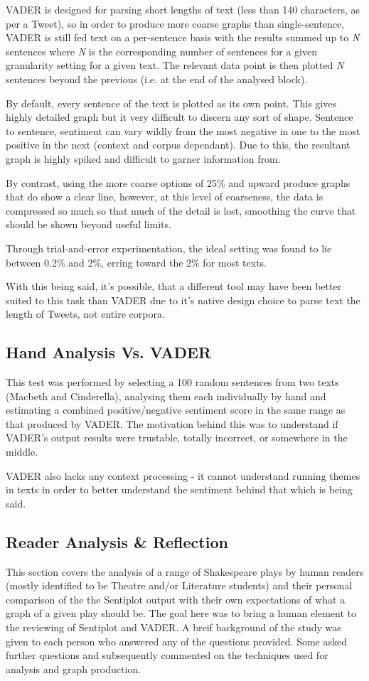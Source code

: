 \documentclass{article}
\begin{document}
        VADER is designed for parsing short lengths of text (less than 140 characters, as per a Tweet), so in order to produce more coarse graphs than single-sentence, VADER is still fed text on a per-sentence basis with the results summed up to \emph{N} sentences where \emph{N} is the corresponding number of sentences for a given granularity setting for a given text. The relevant data point is then plotted \emph{N} sentences beyond the previous (i.e. at the end of the analysed block).

        By default, every sentence of the text is plotted as its own point. This gives highly detailed graph but it very difficult to discern any sort of shape. Sentence to sentence, sentiment can vary wildly from the most negative in one to the most positive in the next (context and corpus dependant). Due to this, the resultant graph is highly spiked and difficult to garner information from.

        By contrast, using the more coarse options of 25\% and upward produce graphs that do show a clear line, however, at this level of coarseness, the data is compressed so much so that much of the detail is lost, smoothing the curve that should be shown beyond useful limits.

        Through trial-and-error experimentation, the ideal setting was found to lie between 0.2\% and 2\%, erring toward the 2\% for most texts.

        
        With this being said, it's possible, that a different tool may have been better suited to this task than VADER due to it's native design choice to parse text the length of Tweets, not entire corpora.
    \subsection{Hand Analysis Vs. VADER}
        This test was performed by selecting a 100 random sentences from two texts (Macbeth and Cinderella), analysing them each individually by hand and estimating a combined positive/negative sentiment score in the same range as that produced by VADER. The motivation behind this was to understand if VADER's output results were trustable, totally incorrect, or somewhere in the middle.

        VADER also lacks any context processing - it cannot understand running themes in texts in order to better understand the sentiment behind that which is being said.
    \subsection{Reader Analysis \& Reflection}
    \label{subsec:reader}
        This section covers the analysis of a range of Shakespeare plays by human readers (mostly identified to be Theatre and/or Literature students) and their personal comparison of the the Sentiplot output with their own expectations of what a graph of a given play should be. The goal here was to bring a human element to the reviewing of Sentiplot and VADER. A breif background of the study was given to each person who answered any of the questions provided. Some asked further questions and subsequently commented on the techniques used for analysis and graph production.
\end{document}
